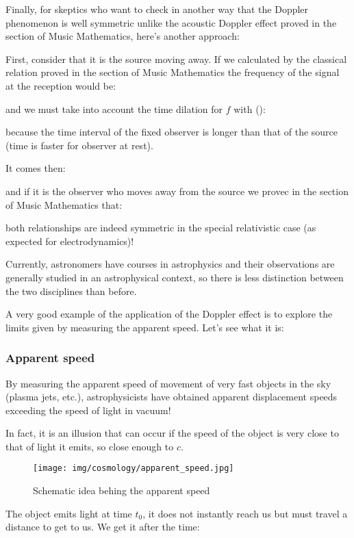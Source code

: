	Finally, for skeptics who want to check in another way that the Doppler phenomenon is well symmetric unlike the acoustic Doppler effect proved in the section of Music Mathematics, here's another approach:

	First, consider that it is the source moving away. If we calculated by the classical relation proved in the section of Music Mathematics the frequency of the signal at the reception would be:
	
	and we must take into account the time dilation for $f$ with ():
	
	because the time interval of the fixed observer is longer than that of the source (time is faster for observer at rest).

	It comes then:
	
	and if it is the observer who moves away from the source we provec in the section of Music Mathematics that:
	
	both relationships are indeed symmetric in the special relativistic case (as expected for electrodynamics)!
	\begin{tcolorbox}[title=Remark,colframe=black,arc=10pt]
	Currently, astronomers have courses in astrophysics and their observations are generally studied in an astrophysical context, so there is less distinction between the two disciplines than before.
	\end{tcolorbox}
	A very good example of the application of the Doppler effect is to explore the limits given by measuring the apparent speed. Let's see what it is:
	
	\subsubsection{Apparent speed}
	By measuring the apparent speed of movement of very fast objects in the sky (plasma jets, etc.), astrophysicists have obtained apparent displacement speeds exceeding the speed of light in vacuum!

	In fact, it is an illusion that can occur if the speed of the object is very close to that of light it emits, so close enough to $c$.
	\begin{figure}[H]
		\centering
		\texttt{[image: img/cosmology/apparent\_speed.jpg]}
		\caption{Schematic idea behing the apparent speed}
	\end{figure}
	The object emits light at time $t_0$, it does not instantly reach us but must travel a distance to get to us. We get it after the time:
	
